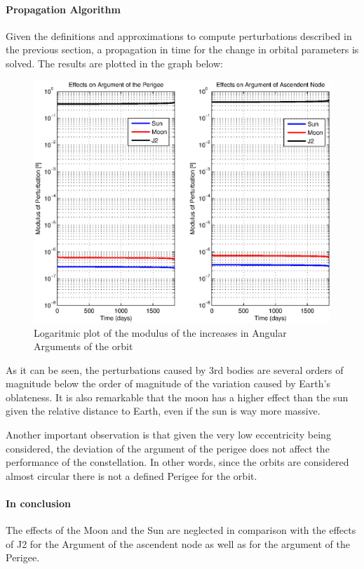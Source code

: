 \paragraph{Propagation Algorithm\\}
Given the definitions and approximations to compute perturbations described in the previous section, a propagation in time for the change in orbital parameters is solved. The results are plotted in the graph below:

\begin{figure}[H]
\centering
\includegraphics[scale=0.7]{SignificativePerturbations/ModulusAngulars.eps}
\caption{Logaritmic plot of the modulus of the increases in Angular Arguments of the orbit}
\end{figure}

As it can be seen, the perturbations caused by 3rd bodies are several orders of magnitude below the order of magnitude of the variation caused by Earth's oblateness. It is also remarkable that the moon has a higher effect than the sun given the relative distance to Earth, even if the sun is way more massive.

Another important observation is that given the very low eccentricity being considered, the deviation of the argument of the perigee does not affect the performance of the constellation. In other words, since the orbits are considered almost circular there is not a defined Perigee for the orbit.

\paragraph{In conclusion\\}
The effects of the Moon and the Sun are neglected in comparison with the effects of J2 for the Argument of the ascendent node as well as for the argument of the Perigee.